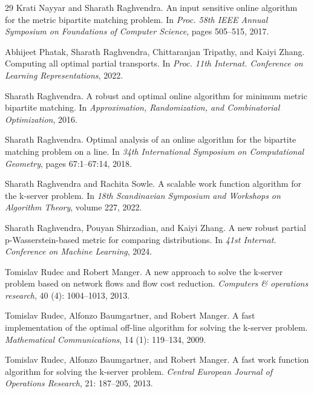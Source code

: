 \documentclass[11pt,onecolumn]{article}
\begin{document}
\begin{thebibliography}{29}
Krati Nayyar and Sharath Raghvendra.
\newblock An input sensitive online algorithm for the metric bipartite matching problem.
\newblock In \emph{Proc. 58th {IEEE} Annual Symposium on Foundations of Computer Science}, pages 505--515, 2017.

Abhijeet Phatak, Sharath Raghvendra, Chittaranjan Tripathy, and Kaiyi Zhang.
\newblock Computing all optimal partial transports.
\newblock In \emph{Proc. 11th Internat. Conference on Learning Representations}, 2022.

Sharath Raghvendra.
\newblock A robust and optimal online algorithm for minimum metric bipartite matching.
\newblock In \emph{Approximation, Randomization, and Combinatorial Optimization}, 2016.

Sharath Raghvendra.
\newblock Optimal analysis of an online algorithm for the bipartite matching problem on a line.
\newblock In \emph{34th International Symposium on Computational Geometry}, pages 67:1--67:14, 2018.

Sharath Raghvendra and Rachita Sowle.
\newblock A scalable work function algorithm for the k-server problem.
\newblock In \emph{18th Scandinavian Symposium and Workshops on Algorithm Theory}, volume 227, 2022.

Sharath Raghvendra, Pouyan Shirzadian, and Kaiyi Zhang.
\newblock A new robust partial p-{Wasserstein}-based metric for comparing distributions.
\newblock In \emph{41st Internat. Conference on Machine Learning}, 2024.

Tomislav Rudec and Robert Manger.
\newblock A new approach to solve the k-server problem based on network flows and flow cost reduction.
\newblock \emph{Computers \& operations research}, 40 (4): 1004--1013, 2013.

Tomislav Rudec, Alfonzo Baumgartner, and Robert Manger.
\newblock A fast implementation of the optimal off-line algorithm for solving the k-server problem.
\newblock \emph{Mathematical Communications}, 14 (1): 119--134, 2009.

Tomislav Rudec, Alfonzo Baumgartner, and Robert Manger.
\newblock A fast work function algorithm for solving the k-server problem.
\newblock \emph{Central European Journal of Operations Research}, 21: 187--205, 2013.


\end{thebibliography}
\end{document}
